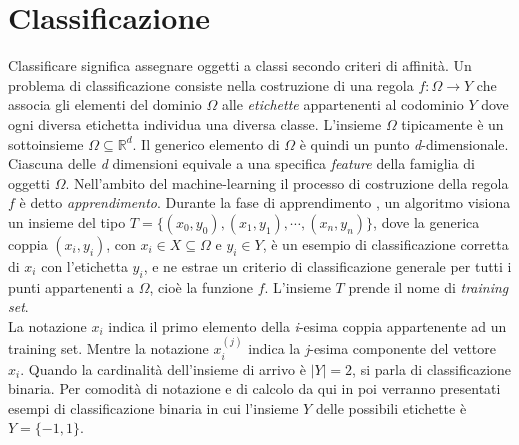 \documentclass [11pt,a4paper,twoside,openright] {book}
\begin{document}
\section{Classificazione}
Classificare significa assegnare oggetti a classi secondo criteri di affinità. Un problema di classificazione consiste nella costruzione di una regola $f: \Omega \rightarrow Y$ che associa gli elementi del dominio $\Omega$ alle \textit{etichette} appartenenti al codominio $Y$ dove ogni diversa etichetta individua una diversa classe. L'insieme $\Omega$ tipicamente è un sottoinsieme $\Omega \subseteq \mathbb{R}^d$. Il generico elemento di $\Omega$ è quindi un punto \textit{d}-dimensionale. Ciascuna delle \textit{d} dimensioni equivale a una specifica \textit{feature} della famiglia di oggetti $\Omega$. Nell'ambito del machine-learning il processo di costruzione della regola $f$ è detto \textit{apprendimento}. Durante la fase di apprendimento , un algoritmo visiona un insieme del tipo $T=\lbrace (x_0,y_0), (x_1,y_1), \cdots, (x_n,y_n) \rbrace$, dove la generica coppia $(x_i,y_i)$, con $x_i \in X \subseteq \Omega$ e $y_i \in Y$, è un esempio di classificazione corretta di $x_i$ con l'etichetta $y_i$, e ne estrae un criterio di classificazione generale per tutti i punti appartenenti a $\Omega$, cioè la funzione $f$. L'insieme $T$ prende il nome di \textit{training set}.\\
La notazione $x_i$ indica il primo elemento della \textit{i}-esima coppia appartenente ad un training set. Mentre la notazione $x_{i}^{(j)}$ indica la \textit{j}-esima componente del vettore $x_i$. Quando la cardinalità dell'insieme di arrivo è $|Y|=2$, si parla di classificazione binaria. Per comodità di notazione e di calcolo da qui in poi verranno presentati esempi di classificazione binaria in cui l'insieme $Y$ delle possibili etichette è $Y=\lbrace-1,1\rbrace$.
\end{document}
